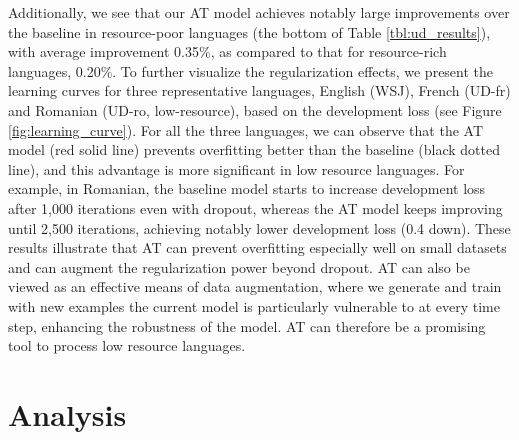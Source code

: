 \documentclass[11pt,a4paper]{article}
\begin{document}
Additionally, we see that our AT model achieves notably large improvements over the baseline in resource-poor languages (the bottom of Table \ref{tbl:ud_results}), with average improvement 0.35\%, as compared to that for resource-rich languages, 0.20\%.
To further visualize the regularization effects, we present the learning curves for three representative languages, English (WSJ), French (UD-fr) and Romanian (UD-ro, low-resource), based on the development loss (see Figure \ref{fig:learning_curve}).
For all the three languages, we can observe that the AT model (red solid line) prevents overfitting better than the baseline (black dotted line), and this advantage is more significant in low resource languages.
For example, in Romanian, the baseline model starts to increase development loss after 1,000 iterations even with dropout, whereas the AT model keeps improving until 2,500 iterations, achieving notably lower development loss (0.4 down).
These results illustrate that AT can prevent overfitting especially well on small datasets and can augment the regularization power beyond dropout.
AT can also be viewed as an effective means of data augmentation, where we generate and train with new examples the current model is particularly vulnerable to at every time step, enhancing the robustness of the model.
AT can therefore be a promising tool to process low resource languages.



\section{Analysis}
\end{document}

